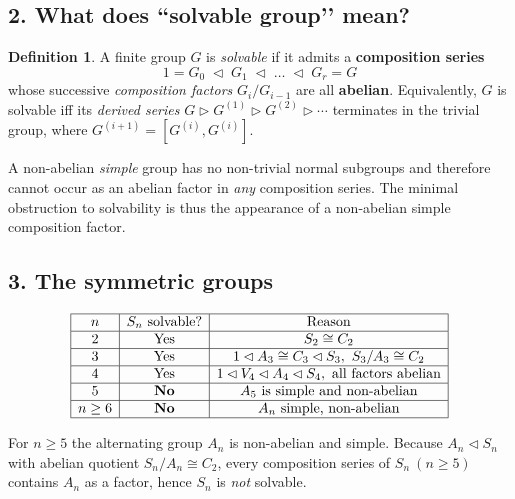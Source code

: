 \documentclass[12pt]{article}
\theoremstyle{definition} %
\newtheorem{definition}{Definition}
\theoremstyle{plain} %
\begin{document}
\subsection*{2.  What does “solvable group’’ mean?}

\begin{definition}
   A finite group \(G\) is \emph{solvable} if it admits a
   \textbf{composition series}
   \[
      1 = G_0 \;\lhd\; G_1 \;\lhd\;\dots\;\lhd\; G_r = G
   \]
   whose successive \emph{composition factors}
   \(G_{i}/G_{i-1}\) are all \textbf{abelian}.
   Equivalently, \(G\) is solvable iff its \emph{derived series}
   \(
      G\triangleright G^{(1)}\triangleright G^{(2)}\triangleright\cdots
   \)
   terminates in the trivial group, where
   \(G^{(i+1)}=[G^{(i)},G^{(i)}]\).
\end{definition}

\noindent
A non-abelian \emph{simple} group has no non-trivial normal subgroups
and therefore cannot occur as an abelian factor in \emph{any}
composition series.  The minimal obstruction to solvability is thus
the appearance of a non-abelian simple composition factor.

\subsection*{3.  The symmetric groups}

\[
\begin{array}{|c|c|c|}
\hline
n & S_n\ \text{solvable?} & \text{Reason} \\ \hline
2 & \text{Yes} & S_2\cong C_2 \\ \hline
3 & \text{Yes} & 1\lhd A_3\cong C_3\lhd S_3,\ 
                 S_3/A_3\cong C_2 \\ \hline
4 & \text{Yes} & 1\lhd V_4\lhd A_4\lhd S_4,\ 
                 \text{all factors abelian} \\ \hline
5 & \textbf{No} & A_5\ \text{is simple and non-abelian} \\ \hline
n\ge6 & \textbf{No} & A_n\ \text{simple, non-abelian} \\ \hline
\end{array}
\]

For \(n\ge5\) the alternating group \(A_n\) is non-abelian and simple.
Because \(A_n\lhd S_n\) with abelian quotient \(S_n/A_n\cong C_2\),
every composition series of \(S_n\ (n\ge5)\) contains \(A_n\) as a
factor, hence \(S_n\) is \emph{not} solvable.
\end{document}
